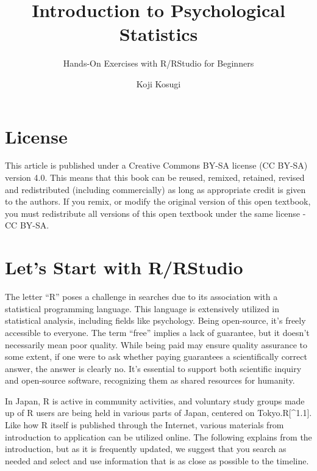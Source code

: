\documentclass[
  a4paper,
]{book}
\title{Introduction to Psychological Statistics}
\subtitle{Hands-On Exercises with R/RStudio for Beginners}
\author{Koji Kosugi}
\date{}
\renewcommand*\contentsname{Table of contents}
\newcommand\contentsname{Table of contents}
\begin{document}
\frontmatter
\maketitle

\renewcommand*\contentsname{Table of contents}
{
\hypersetup{linkcolor=}
\setcounter{tocdepth}{2}
\tableofcontents
}
\mainmatter
{}

\chapter*{License}\label{license}


This article is published under a Creative Commons BY-SA license (CC
BY-SA) version 4.0. This means that this book can be reused, remixed,
retained, revised and redistributed (including commercially) as long as
appropriate credit is given to the authors. If you remix, or modify the
original version of this open textbook, you must redistribute all
versions of this open textbook under the same license - CC BY-SA.


\chapter{Let's Start with R/RStudio}\label{lets-start-with-rrstudio}

The letter ``R'' poses a challenge in searches due to its association
with a statistical programming language. This language is extensively
utilized in statistical analysis, including fields like psychology.
Being open-source, it's freely accessible to everyone. The term ``free''
implies a lack of guarantee, but it doesn't necessarily mean poor
quality. While being paid may ensure quality assurance to some extent,
if one were to ask whether paying guarantees a scientifically correct
answer, the answer is clearly no. It's essential to support both
scientific inquiry and open-source software, recognizing them as shared
resources for humanity.

In Japan, R is active in community activities, and voluntary study
groups made up of R users are being held in various parts of Japan,
centered on Tokyo.R{[}\^{}1.1{]}. Like how R itself is published through
the Internet, various materials from introduction to application can be
utilized online. The following explains from the introduction, but as it
is frequently updated, we suggest that you search as needed and select
and use information that is as close as possible to the timeline.
\end{document}
